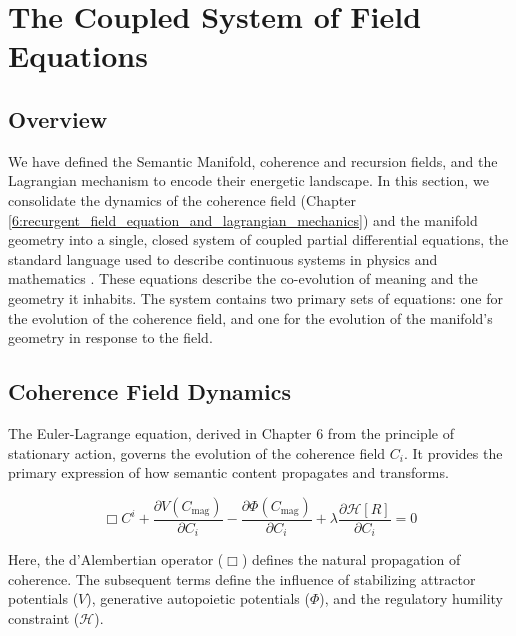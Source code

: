 \chapter{The Coupled System of Field Equations}
\label{10:the_coupled_system_of_field_equations}


\section{Overview}
\label{10.1:overview}

We have defined the Semantic Manifold, coherence and recursion fields, and the Lagrangian mechanism to encode their energetic landscape. In this section, we consolidate the dynamics of the coherence field (Chapter \ref{6:recurgent_field_equation_and_lagrangian_mechanics}) and the manifold geometry into a single, closed system of coupled partial differential equations, the standard language used to describe continuous systems in physics and mathematics \autocite{Evans2010}. These equations describe the co-evolution of meaning and the geometry it inhabits. The system contains two primary sets of equations: one for the evolution of the coherence field, and one for the evolution of the manifold's geometry in response to the field.


\section{Coherence Field Dynamics}
\label{10.2:coherence_field_dynamics}

The Euler-Lagrange equation, derived in Chapter 6 from the principle of stationary action, governs the evolution of the coherence field \(C_i\). It provides the primary expression of how semantic content propagates and transforms.

\begin{equation}
\Box C^i + \frac{\partial V(C_{\mathrm{mag}})}{\partial C_i} - \frac{\partial \Phi(C_{\mathrm{mag}})}{\partial C_i} + \lambda \frac{\partial \mathcal{H}[R]}{\partial C_i} = 0
\end{equation}

Here, the d'Alembertian operator (\(\Box\)) defines the natural propagation of coherence. The subsequent terms define the influence of stabilizing attractor potentials (\(V\)), generative autopoietic potentials (\(\Phi\)), and the regulatory humility constraint (\(\mathcal{H}\)).

